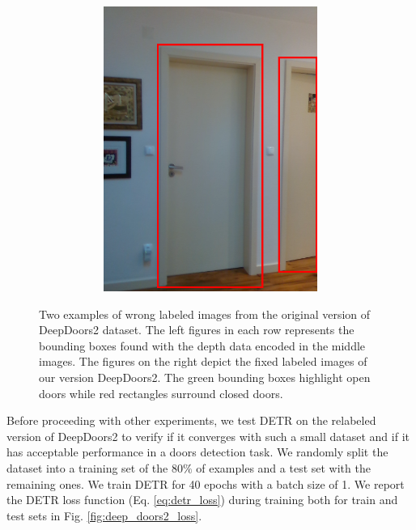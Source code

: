 \begin{figure}[h!]
\begin{subfigure}[b]{\linewidth}
\begin{subfigure}[b]{0.32\linewidth}
			\includegraphics[width=\linewidth]{images/deep_doors_2_labeling2_correct.png}
		\end{subfigure}
		\caption{}
	\end{subfigure}
	\caption{Two examples of wrong labeled images from the original version of DeepDoors2 dataset. The left figures in each row represents the bounding boxes found with the depth data encoded in the middle images. The figures on the right depict the fixed labeled images of our version DeepDoors2. The green bounding boxes highlight open doors while red rectangles surround closed doors.}
	\label{fig:relabeling_deepdoors2}
\end{figure}

Before proceeding with other experiments, we test DETR on the relabeled version of DeepDoors2 to verify if it converges with such a small dataset and if it has acceptable performance in a doors detection task. We randomly split the dataset into a training set of the $80\%$ of examples and a test set with the remaining ones. We train DETR for 40 epochs with a batch size of 1. We report the DETR loss function (Eq. \ref{eq:detr_loss}) during training both for train and test sets in Fig. \ref{fig:deep_doors2_loss}.

